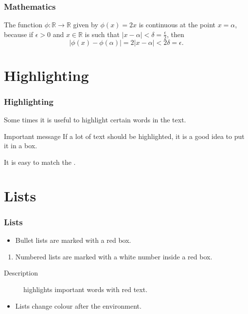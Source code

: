 \documentclass[UKenglish]{beamer}
\begin{document}
\begin{frame}
    \frametitle{Mathematics}

    \begin{example}
        The function \(\phi \colon \mathbb{R} \to \mathbb{R}\) given by \(\phi(x) = 2x\) is continuous at the point \(x = \alpha\),
        because if \(\epsilon > 0\) and \(x \in \mathbb{R}\) is such that \(\lvert x - \alpha \rvert < \delta = \frac{\epsilon}{2}\),
        then
        \begin{equation*}
            \lvert \phi(x) - \phi(\alpha)\rvert = 2\lvert x - \alpha \rvert < 2\delta = \epsilon.
        \end{equation*}
    \end{example}
\end{frame}

\section{Highlighting}

\begin{frame}
    \frametitle{Highlighting}

    Some times it is useful to \alert{highlight} certain words in the text.

    \begin{alertblock}{Important message}
        If a lot of text should be \alert{highlighted}, it is a good idea to put it in a box.
    \end{alertblock}

    It is easy to match the .
\end{frame}

\section{Lists}

\begin{frame}
    \frametitle{Lists}

    \begin{itemize}
        \item
        Bullet lists are marked with a red box.
    \end{itemize}

    \begin{enumerate}
        \item
        Numbered lists are marked with a white number inside a red box.
    \end{enumerate}

    \begin{description}
        \item[Description] highlights important words with red text.
    \end{description}

    \begin{example}
        \begin{itemize}
            \item
            Lists change colour after the environment.
        \end{itemize}
    \end{example}
\end{frame}
\end{document}
